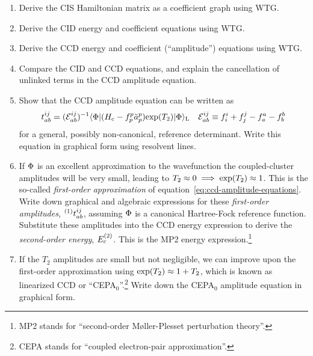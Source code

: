 \documentclass[11pt]{article}
\begin{document}
\begin{enumerate}
\item
  Derive the CIS Hamiltonian matrix as a coefficient graph using WTG.

\item
  Derive the CID energy and coefficient equations using WTG.

\item\label{item:ccd}
  Derive the CCD energy and coefficient (``amplitude'') equations using WTG.

\item
  Compare the CID and CCD equations, and explain the cancellation of unlinked terms in the CCD amplitude equation.

\item\label{item:ccd-final}
  Show that the CCD amplitude equation can be written as
\begin{align}
\label{eq:ccd-amplitude-equations}
  t_{ab}^{ij}
=
  (\mathcal{E}_{ab}^{ij})^{-1}
  \langle\Phi |
    (H_{\mathrm{c}} - f_p^p\tilde{a}^p_p)
    \mathrm{exp}(T_2)
  |\Phi \rangle_{\mathrm{L}}
&&
  \mathcal{E}_{ab}^{ij}
\equiv
  f_i^i
+
  f_j^j
-
  f_a^a
-
  f_b^b
\end{align}
  for a general, possibly non-canonical, reference determinant.
  Write this equation in graphical form using resolvent lines.

\item
  If $\Phi $ is an excellent approximation to the wavefunction the coupled-cluster amplitudes will be very small, leading to $T_2\approx 0\implies\mathrm{exp}(T_2)\approx 1$.
  This is the so-called \textit{first-order approximation} of equation~\ref{eq:ccd-amplitude-equations}.
  Write down graphical and algebraic expressions for these \textit{first-order amplitudes}, ${}^{(1)}t_{ab}^{ij}$, assuming $\Phi $ is a canonical Hartree-Fock reference function.
  Substitute these amplitudes into the CCD energy expression to derive the \textit{second-order energy}, $E_c^{(2)}$.
  This is the MP2 energy expression.\footnote{MP2 stands for ``second-order M\o ller-Plesset perturbation theory''.}

\item
  If the $T_2$ amplitudes are small but not negligible, we can improve upon the first-order approximation using $\mathrm{exp}(T_2)\approx 1 + T_2$, which is known as linearized CCD or ``CEPA$_0$''.\footnote{CEPA stands for ``coupled electron-pair approximation''.}
  Write down the CEPA$_0$ amplitude equation in graphical form.


\end{enumerate}
\end{document}

